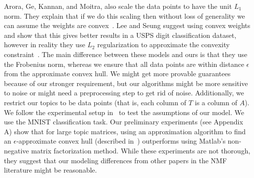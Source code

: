 Arora, Ge, Kannan, and Moitra, also scale the data points to have the unit $L_1$ norm. They explain that if we do this scaling then without loss of generality we can assume the weights are convex~\cite{Arora:2012:CNM:2213977.2213994, moitramonograph}. Lee and Seung suggest using convex weights and show that this gives better results in a USPS digit classification dataset, however in reality they use $L_2$ regularization to approximate the convexity constraint~\cite{Lee97unsupervisedlearning}. The main difference between these models and ours is that they use the Frobenius norm, whereas we ensure that all data points are within distance $\epsilon$ from the approximate convex hull. We might get more provable guarantees because of our stronger requirement, but our algorithms might be more sensitive to noise or might need a preprocessing step to get rid of noise. Additionally, we restrict our topics to be data points (that is, each column of $T$ is a column of $A$).
\\

We follow the experimental setup in~\cite{Lee97unsupervisedlearning} to test the assumptions of our model. We use the MNIST classification task. Our preliminary experiments (see Appendix A) show that for large topic matrices, using an approximation algorithm to find an $\epsilon$-approximate convex hull (described in~\cite{blum-peled}) outperforms using Matlab's non-negative matrix factorization method. While these experiments are not thorough, they suggest that our modeling differences from other papers in the NMF literature might be reasonable.

